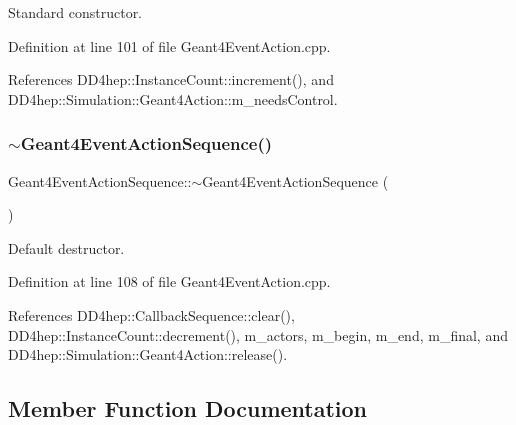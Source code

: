 Standard constructor. 



Definition at line 101 of file Geant4\+Event\+Action.\+cpp.



References D\+D4hep\+::\+Instance\+Count\+::increment(), and D\+D4hep\+::\+Simulation\+::\+Geant4\+Action\+::m\+\_\+needs\+Control.

\hypertarget{class_d_d4hep_1_1_simulation_1_1_geant4_event_action_sequence_af5bbb63ed3aceb9249cbba78c47fd241}{}\label{class_d_d4hep_1_1_simulation_1_1_geant4_event_action_sequence_af5bbb63ed3aceb9249cbba78c47fd241} 
\subsubsection{\texorpdfstring{$\sim$\+Geant4\+Event\+Action\+Sequence()}{~Geant4EventActionSequence()}}
{\footnotesize\ttfamily Geant4\+Event\+Action\+Sequence\+::$\sim$\+Geant4\+Event\+Action\+Sequence (\begin{DoxyParamCaption}{ }\end{DoxyParamCaption})\hspace{0.3cm}{\ttfamily [virtual]}}



Default destructor. 



Definition at line 108 of file Geant4\+Event\+Action.\+cpp.



References D\+D4hep\+::\+Callback\+Sequence\+::clear(), D\+D4hep\+::\+Instance\+Count\+::decrement(), m\+\_\+actors, m\+\_\+begin, m\+\_\+end, m\+\_\+final, and D\+D4hep\+::\+Simulation\+::\+Geant4\+Action\+::release().



\subsection{Member Function Documentation}
\hypertarget{class_d_d4hep_1_1_simulation_1_1_geant4_event_action_sequence_a21013600fd6c11994991e76878fb0896}{}\label{class_d_d4hep_1_1_simulation_1_1_geant4_event_action_sequence_a21013600fd6c11994991e76878fb0896} 
